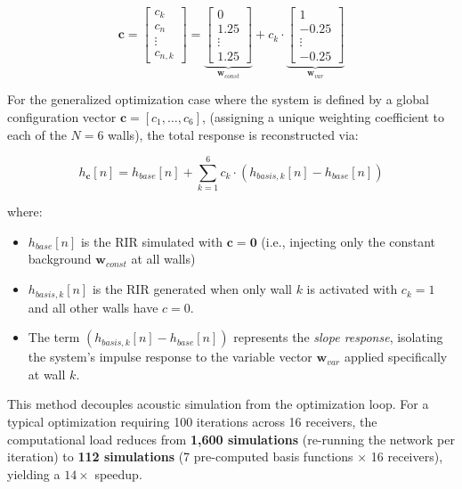\documentclass[conference]{IEEEtran}
\begin{document}
\begin{equation}
\mathbf{c} = \begin{bmatrix} c_k \\ c_n \\ \vdots \\ c_{n,k} \end{bmatrix} = \underbrace{\begin{bmatrix} 0 \\ 1.25 \\ \vdots \\ 1.25 \end{bmatrix}}_{\mathbf{w}_{const}} + c_k \cdot \underbrace{\begin{bmatrix} 1 \\ -0.25 \\ \vdots \\ -0.25 \end{bmatrix}}_{\mathbf{w}_{var}}
\label{eq:vector_decomposition}
\end{equation}

For the generalized optimization case where the system is defined by a global configuration vector $\mathbf{c} = [c_1, \dots, c_6]$, (assigning a unique weighting coefficient to each of the $N=6$ walls), the total response is reconstructed via:

\begin{equation} h_{\mathbf{c}}[n] = h_{base}[n] + \sum_{k=1}^{6} c_k \cdot \left( h_{basis, k}[n] - h_{base}[n] \right) \label{eq:fast_reconstruction} \end{equation}


\noindent where:
\begin{itemize}
    \item $h_{base}[n]$ is the RIR simulated with $\mathbf{c} = \mathbf{0}$
    (i.e., injecting only the constant background $\mathbf{w}_{const}$ at all walls)
    \item $h_{basis, k}[n]$ is the RIR generated when only wall $k$ is activated with $c_k=1$ and all other walls have $c=0$.
    \item The term $(h_{basis, k}[n] - h_{base}[n])$ represents the \textit{slope response}, isolating the system's impulse response to the variable vector $\mathbf{w}_{var}$ applied specifically at wall $k$.
\end{itemize}

This method decouples acoustic simulation from the optimization loop. For a typical optimization requiring 100 iterations across 16 receivers, the computational load reduces from \textbf{1,600 simulations} (re-running the network per iteration) to \textbf{112 simulations} (7 pre-computed basis functions $\times$ 16 receivers), yielding a $14\times$ speedup.
\end{document}

